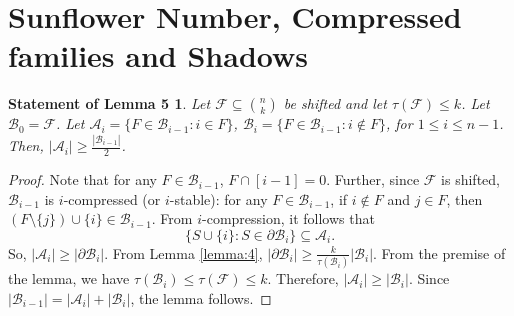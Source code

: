\documentclass[runningheads,12pt,a4paper]{article}
\newtheorem*{statement5}{Statement of Lemma 5}
\begin{document}
	
	

\section{Sunflower Number, Compressed families and Shadows}\label{sec:ss}



\begin{statement5}
	Let $\mathcal{F} \subseteq \binom{n}{k}$ be shifted and  let $\tau(\mathcal{F}) \leq k$.
	Let $\mathcal{B}_0=\mathcal{F}$.
	Let $\mathcal{A}_i=\{F \in \mathcal{B}_{i-1} : i \in F\}$,
	$\mathcal{B}_i= \{F \in \mathcal{B}_{i-1} : i \notin F\}$, for $1 \leq i \leq n-1$. Then,
	$|\mathcal{A}_i| \geq \frac{|\mathcal{B}_{i-1}|}{2}$.
\end{statement5}

\begin{proof}
	Note that for any  $F \in \mathcal{B}_{i-1}$, $F \cap [i-1]=0$.		
	Further, since $\mathcal{F}$ is shifted,  $\mathcal{B}_{i-1}$ is $i$-compressed (or $i$-stable): for any $F \in \mathcal{B}_{i-1}$, if $i \notin F$ and $j \in F$, then $(F \setminus \{j\}) \cup \{i\} \in \mathcal{B}_{i-1}$.
	From $i$-compression, it follows that 
	$$\{ S \cup \{i\} : S \in \partial \mathcal{B}_{i} \} \subseteq \mathcal{A}_i.$$
	So, $|\mathcal{A}_i| \geq  |\partial \mathcal{B}_{i}|.$
	From Lemma \ref{lemma:4}, $|\partial\mathcal{B}_i|\geq \frac{k}{\tau(\mathcal{B}_i)}|\mathcal{B}_i|$. 
	From the premise of the lemma, we have $\tau(\mathcal{B}_i) \leq \tau(\mathcal{F}) \leq k$.
	Therefore, $|\mathcal{A}_i|\geq |\mathcal{B}_i|$. Since $|\mathcal{B}_{i-1}|=|\mathcal{A}_i|+|\mathcal{B}_{i}|$, the lemma follows.
\end{proof}
\end{document}
